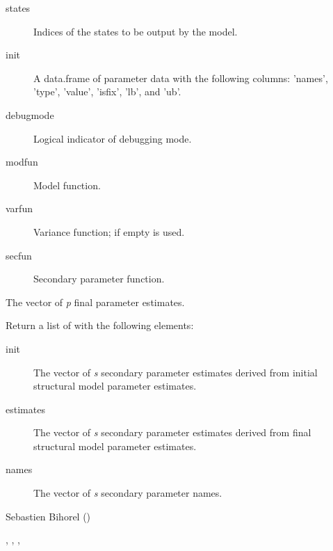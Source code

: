 \begin{Arguments}
\begin{ldescription}
\begin{description}
\begin{description}
\end{description}

\item[states] Indices of the states to be output by the model.
\item[init] A data.frame of parameter data with the following columns:
'names', 'type', 'value', 'isfix', 'lb', and 'ub'.
\item[debugmode] Logical indicator of debugging mode.
\item[modfun] Model function.
\item[varfun] Variance function; if empty  is
used.
\item[secfun] Secondary parameter function.

\end{description}


\item[\code{x}] The vector of \emph{p} final parameter estimates.
\end{ldescription}
\end{Arguments}
%
\begin{Value}
Return a list of with the following elements:\begin{description}

\item[init] The vector of \emph{s} secondary parameter estimates derived
from initial structural model parameter estimates.
\item[estimates] The vector of \emph{s} secondary parameter estimates
derived from final structural model parameter estimates.
\item[names] The vector of \emph{s} secondary parameter names.

\end{description}

\end{Value}
%
\begin{Author}\relax
Sebastien Bihorel ()
\end{Author}
%
\begin{SeeAlso}\relax
{},
,
,
\end{SeeAlso}
